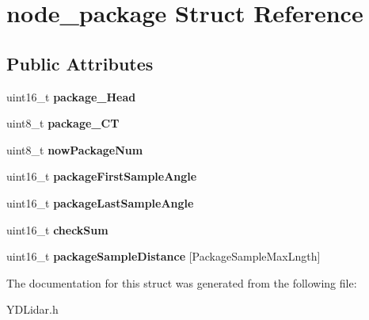 \hypertarget{structnode__package}{}\section{node\+\_\+package Struct Reference}
\label{structnode__package}
\subsection*{Public Attributes}
\begin{DoxyCompactItemize}
\item 
uint16\+\_\+t {\bfseries package\+\_\+\+Head}\hypertarget{structnode__package_a6d48d3a1d1ef718065a82e7495fa2b26}{}\label{structnode__package_a6d48d3a1d1ef718065a82e7495fa2b26}

\item 
uint8\+\_\+t {\bfseries package\+\_\+\+CT}\hypertarget{structnode__package_a3be7b81a7cc4b7ef7beb816ccd414579}{}\label{structnode__package_a3be7b81a7cc4b7ef7beb816ccd414579}

\item 
uint8\+\_\+t {\bfseries now\+Package\+Num}\hypertarget{structnode__package_aad0a75920ad5c1393f1b00904ece2d67}{}\label{structnode__package_aad0a75920ad5c1393f1b00904ece2d67}

\item 
uint16\+\_\+t {\bfseries package\+First\+Sample\+Angle}\hypertarget{structnode__package_ac224f6450e8bd5bd069149babc37e1c4}{}\label{structnode__package_ac224f6450e8bd5bd069149babc37e1c4}

\item 
uint16\+\_\+t {\bfseries package\+Last\+Sample\+Angle}\hypertarget{structnode__package_af5768e03270d3b7d7f58b3b82156dc2e}{}\label{structnode__package_af5768e03270d3b7d7f58b3b82156dc2e}

\item 
uint16\+\_\+t {\bfseries check\+Sum}\hypertarget{structnode__package_a4b6d9990da9343143161aae929bb986e}{}\label{structnode__package_a4b6d9990da9343143161aae929bb986e}

\item 
uint16\+\_\+t {\bfseries package\+Sample\+Distance} \mbox{[}Package\+Sample\+Max\+Lngth\mbox{]}\hypertarget{structnode__package_a00ee27fc439bd21ed97ee20fe7febdc9}{}\label{structnode__package_a00ee27fc439bd21ed97ee20fe7febdc9}

\end{DoxyCompactItemize}


The documentation for this struct was generated from the following file\+:\begin{DoxyCompactItemize}
\item 
Y\+D\+Lidar.\+h\end{DoxyCompactItemize}
